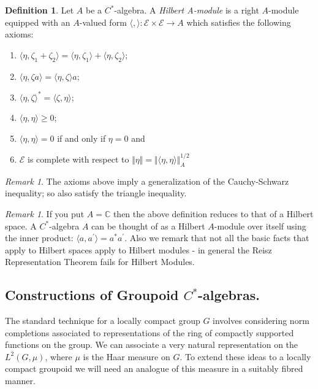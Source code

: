 \documentclass[11pt,]{amsbook}
\theoremstyle{plain}
\theoremstyle{definition}%
\newtheorem{definition}[theorem]{Definition}%
\theoremstyle{remark}%
\newtheorem{remark}[theorem]{Remark}%
\begin{document}
\begin{definition}
Let $A$ be a $C^{*}$-algebra. A \textit{Hilbert A-module}  is a right $A$-module equipped with an $A$-valued form $\langle , \rangle: \mathscr{E} \times \mathscr{E} \rightarrow A$ which satisfies the following axioms:
\begin{enumerate}
\item $\langle \eta ,\zeta_{1} + \zeta_{2} \rangle = \langle \eta , \zeta_{1}\rangle + \langle \eta ,\zeta_{2} \rangle$;
\item $\langle \eta , \zeta a \rangle = \langle \eta ,\zeta \rangle a$;
\item $\langle \eta , \zeta \rangle^{*} = \langle \zeta ,\eta \rangle$;
\item $\langle \eta, \eta \rangle \geq 0$;
\item $\langle \eta ,\eta  \rangle = 0 $ if and only if $ \eta = 0$ and
\item $\mathscr{E}$ is complete with respect to $\Vert \eta \Vert = \Vert \langle \eta , \eta \rangle \Vert_{A}^{1/2}$
\end{enumerate}
\end{definition}

\begin{remark}
The axioms above imply a generalization of the Cauchy-Schwarz inequality; so also satisfy the triangle inequality.
\end{remark}

\begin{remark}
If you put $A= \mathbb{C}$ then the above definition reduces to that of a Hilbert space. A $C^{*}$-algebra $A$ can be thought of as a Hilbert $A$-module over itself using the inner product: $\langle a, a^{'} \rangle = a^{*}a^{'}$. Also we remark that not all the basic facts that apply to Hilbert spaces apply to Hilbert modules - in general the Reisz Representation Theorem fails for Hilbert Modules.
\end{remark}

\subsection{Constructions of Groupoid \texorpdfstring{$C^{*}$}{C*}-algebras.} The standard technique for a locally compact group $G$ involves considering norm completions associated to representations of the ring of compactly supported functions on the group. We can associate a very natural representation on the $L^{2}(G,\mu)$, where $\mu$ is the Haar measure on $G$. To extend these ideas to a locally compact groupoid we will need an analogue of this measure in a suitably fibred manner.
\end{document}
